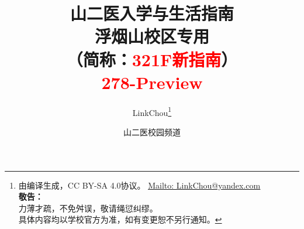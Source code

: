 

\title{%
\normalsize
{\Huge\textbf{山二医入学与生活指南}}\\[6pt]
{\large\textbf{浮烟山校区专用}}\\
（简称：\textcolor{red}{321F新指南}）\\[15pt]
{\large\textcolor{red}{278-Preview}}\vspace*{-25pt}}
\author{LinkChou\thanks{由\LaTeXe 编译生成，CC BY-SA 4.0协议。%
                \uline{\href{Mailto:LinkChou@yandex.com}{Mailto: LinkChou@yandex.com}}\\%
                \textbf{敬告：}\\%
                \indent\indent 力薄才疏，不免舛误，敬请绳愆纠缪。\\%
                \indent\indent 具体内容均以学校官方为准，如有变更恕不另行通知。}\and 山二医校园频道}
\date{\DTMnow}
\maketitle

\renewcommand{\thefootnote}{\arabic{footnote}}

\tableofcontents
